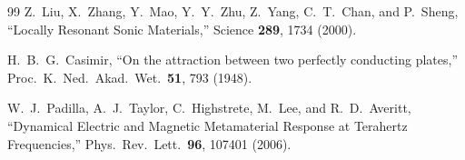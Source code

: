 \documentclass[12pt,aps,prd,twocolumn,superscriptaddress,nofootinbib]{revtex4-2}
\begin{document}
\begin{thebibliography}{99}
Z.~Liu, X.~Zhang, Y.~Mao, Y.~Y.~Zhu, Z.~Yang, C.~T.~Chan,
and P.~Sheng,
``Locally Resonant Sonic Materials,''
Science \textbf{289}, 1734 (2000).

H.~B.~G.~Casimir,
``On the attraction between two perfectly conducting plates,''
Proc.\ K.\ Ned.\ Akad.\ Wet.\ \textbf{51}, 793 (1948).

W.~J.~Padilla, A.~J.~Taylor, C.~Highstrete, M.~Lee,
and R.~D.~Averitt,
``Dynamical Electric and Magnetic Metamaterial Response at Terahertz
Frequencies,''
Phys.\ Rev.\ Lett.\ \textbf{96}, 107401 (2006).

\end{thebibliography}
\end{document}
